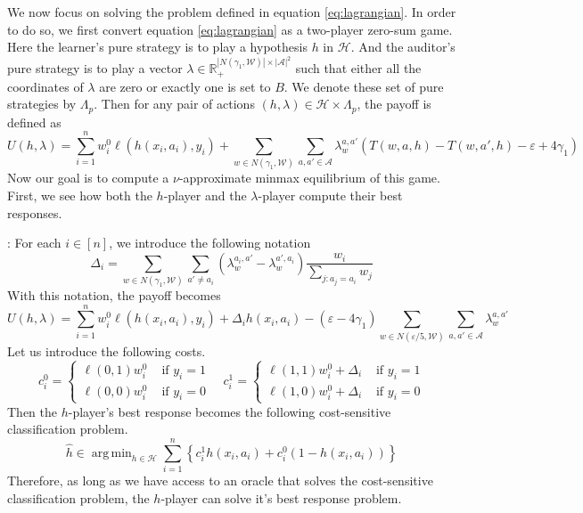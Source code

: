 \documentclass[11pt]{article}
\renewcommand{\hat}{\widehat}
\newcommand{\bbR}{\mathbb{R}}
\DeclareMathOperator*{\argmin}{arg\,min}
\newcommand{\WW}{\mathcal{W}}
\newcommand{\abs}[1]{\left|#1\right|}
\newcommand{\Ac}{\mathcal{A}}
\newcommand{\HH}{\mathcal{H}}
\newcommand{\eps}{\varepsilon}
\begin{document}
We now focus on solving the problem defined in equation \ref{eq:lagrangian}. In order to do so, we first convert equation \ref{eq:lagrangian} as a two-player zero-sum game. Here the learner's pure strategy is to play a hypothesis $h$ in $\HH$. And the auditor's pure strategy is to play a vector $\lambda \in \bbR_+^{\abs{N(\gamma_1,\WW)} \times \abs{\Ac}^2}$ such that either all the coordinates of $\lambda$ are zero or exactly one is set to $B$. We denote these set of pure strategies by $\Lambda_p$. Then for any pair of actions $(h,\lambda) \in \HH \times \Lambda_p$, the payoff is defined as
\[U(h,\lambda) = \sum_{i=1}^n w^0_i \ell(h(x_i,a_i),y_i) + \sum_{w \in N(\gamma_1,\WW)} \sum_{a,a' \in \Ac} \lambda_w^{a,a'} ( T(w,a,h) - T(w,a',h) - \eps + 4\gamma_1) \]
Now our goal is to compute a $\nu$-approximate minmax equilibrium of this game. First, we see how both the $h$-player and the $\lambda$-player compute their best responses. 

: For each $i \in [n]$, we introduce the following notation
$$\Delta_i = \sum_{w \in N(\gamma_1,\WW)} \sum_{a' \neq a_i} \left(\lambda^{a_i,a'}_w - \lambda^{a',a_i}_w \right) \frac{w_i}{\sum_{j:a_j = a_i}w_j}$$
With this notation, the payoff becomes
$$U(h,\lambda) = \sum_{i=1}^n w^0_i \ell(h(x_i,a_i),y_i) + \Delta_i h(x_i,a_i) - (\eps - 4\gamma_1)\sum_{w \in N(\eps/5,\WW)} \sum_{a,a' \in \Ac} \lambda_w^{a,a'}$$
Let us introduce the following costs.
\begin{equation}
c^0_i = \left\{ \begin{array}{cc}
\ell(0,1)w^0_i & \text{ if } y_i = 1\\
\ell(0,0)w^0_i & \text{ if } y_i = 0
\end{array}\right. \quad 
c^1_i = \left\{ \begin{array}{cc}
\ell(1,1)w^0_i + \Delta_i & \text{ if } y_i = 1\\
\ell(1,0)w^0_i + \Delta_i & \text{ if } y_i = 0
\end{array}\right.
\end{equation}
Then the $h$-player's best response becomes the following cost-sensitive classification problem.
\begin{equation}
\hat{h} \in \argmin_{h \in \HH} \sum_{i=1}^n \left\{c^1_i h(x_i,a_i) + c^0_i (1 - h(x_i,a_i)) \right\}
\end{equation}
Therefore, as long as we have access to an oracle that solves the cost-sensitive classification problem, the $h$-player can solve it's best response problem.
\end{document}
